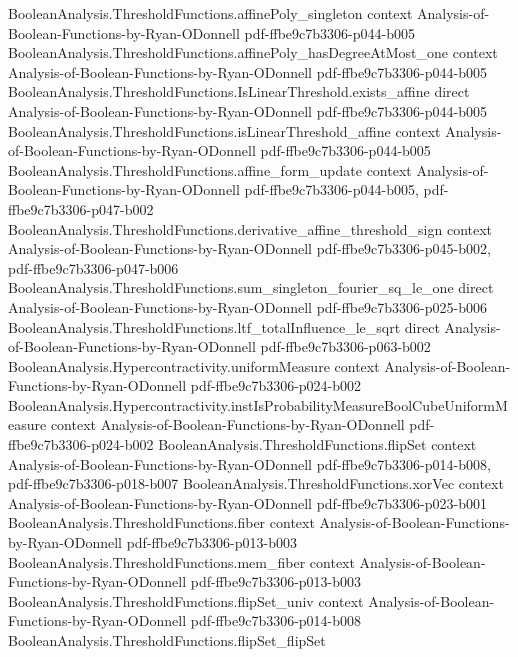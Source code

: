 \begin{lemma}
\proofstep
  {BooleanAnalysis.ThresholdFunctions.affinePoly_singleton}
  {context}
  {Analysis-of-Boolean-Functions-by-Ryan-ODonnell}
  {pdf-ffbe9c7b3306-p044-b005}
\proofstep
  {BooleanAnalysis.ThresholdFunctions.affinePoly_hasDegreeAtMost_one}
  {context}
  {Analysis-of-Boolean-Functions-by-Ryan-ODonnell}
  {pdf-ffbe9c7b3306-p044-b005}
\proofstep
  {BooleanAnalysis.ThresholdFunctions.IsLinearThreshold.exists_affine}
  {direct}
  {Analysis-of-Boolean-Functions-by-Ryan-ODonnell}
  {pdf-ffbe9c7b3306-p044-b005}
\proofstep
  {BooleanAnalysis.ThresholdFunctions.isLinearThreshold_affine}
  {context}
  {Analysis-of-Boolean-Functions-by-Ryan-ODonnell}
  {pdf-ffbe9c7b3306-p044-b005}
\proofstep
  {BooleanAnalysis.ThresholdFunctions.affine_form_update}
  {context}
  {Analysis-of-Boolean-Functions-by-Ryan-ODonnell}
  {pdf-ffbe9c7b3306-p044-b005,
    pdf-ffbe9c7b3306-p047-b002}
\proofstep
  {BooleanAnalysis.ThresholdFunctions.derivative_affine_threshold_sign}
  {context}
  {Analysis-of-Boolean-Functions-by-Ryan-ODonnell}
  {pdf-ffbe9c7b3306-p045-b002,
    pdf-ffbe9c7b3306-p047-b006}
\proofstep
  {BooleanAnalysis.ThresholdFunctions.sum_singleton_fourier_sq_le_one}
  {direct}
  {Analysis-of-Boolean-Functions-by-Ryan-ODonnell}
  {pdf-ffbe9c7b3306-p025-b006}
\proofstep
  {BooleanAnalysis.ThresholdFunctions.ltf_totalInfluence_le_sqrt}
  {direct}
  {Analysis-of-Boolean-Functions-by-Ryan-ODonnell}
  {pdf-ffbe9c7b3306-p063-b002}
\proofstep
  {BooleanAnalysis.Hypercontractivity.uniformMeasure}
  {context}
  {Analysis-of-Boolean-Functions-by-Ryan-ODonnell}
  {pdf-ffbe9c7b3306-p024-b002}
\proofstep
  {BooleanAnalysis.Hypercontractivity.instIsProbabilityMeasureBoolCubeUniformMeasure}
  {context}
  {Analysis-of-Boolean-Functions-by-Ryan-ODonnell}
  {pdf-ffbe9c7b3306-p024-b002}
\proofstep
  {BooleanAnalysis.ThresholdFunctions.flipSet}
  {context}
  {Analysis-of-Boolean-Functions-by-Ryan-ODonnell}
  {pdf-ffbe9c7b3306-p014-b008,
    pdf-ffbe9c7b3306-p018-b007}
\proofstep
  {BooleanAnalysis.ThresholdFunctions.xorVec}
  {context}
  {Analysis-of-Boolean-Functions-by-Ryan-ODonnell}
  {pdf-ffbe9c7b3306-p023-b001}
\proofstep
  {BooleanAnalysis.ThresholdFunctions.fiber}
  {context}
  {Analysis-of-Boolean-Functions-by-Ryan-ODonnell}
  {pdf-ffbe9c7b3306-p013-b003}
\proofstep
  {BooleanAnalysis.ThresholdFunctions.mem_fiber}
  {context}
  {Analysis-of-Boolean-Functions-by-Ryan-ODonnell}
  {pdf-ffbe9c7b3306-p013-b003}
\proofstep
  {BooleanAnalysis.ThresholdFunctions.flipSet_univ}
  {context}
  {Analysis-of-Boolean-Functions-by-Ryan-ODonnell}
  {pdf-ffbe9c7b3306-p014-b008}
\proofstep
  {BooleanAnalysis.ThresholdFunctions.flipSet_flipSet}

\end{lemma}
